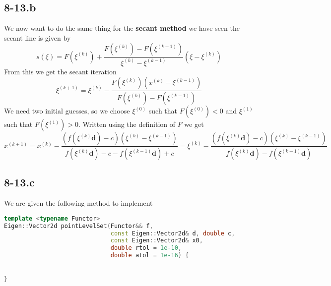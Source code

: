 \documentclass{article}
\begin{document}
\subsection*{8-13.b} We now want to do the same thing for the \textbf{secant method} we have seen the secant line is given by 
\begin{equation*}
    s\left(\xi\right) = F\left(\xi^{\left(k\right)}\right) + \frac{F\left(\xi^{\left(k\right)}\right) - F\left(\xi^{\left(k-1\right)}\right)}{\xi^{\left(k\right)}-\xi^{\left(k-1\right)}}\left(\xi - \xi^{\left(k\right)}\right)
\end{equation*}
From this we get the secant iteration
\begin{equation*}
    \xi^{\left(k+1\right)} = 
 \xi^{\left(k\right)} -\frac{F\left(\xi^{\left(k\right)}\right)\left(x^{\left(k\right)} - \xi^{\left(k-1\right)}\right)}{F\left(\xi^{\left(k\right)}\right)-F\left(\xi^{\left(k-1\right)}\right)}
\end{equation*}
We need two initial guesses, so we choose $\xi^{\left(0\right)}$ such that $F\left(\xi^{\left(0\right)}\right) <0$ and $\xi^{\left(1\right)}$ such that $F\left(\xi^{\left(1\right)}\right) >0$. Written using the definition of $F$ we get
\begin{equation*}
   x^{\left(k+1\right)} = x^{\left(k\right)} -\frac{\left(f\left(\xi^{\left(k\right)}\mathbf{d}\right)-c\right)\left(\xi^{\left(k\right)} - \xi^{\left(k-1\right)}\right)}{f\left(\xi^{\left(k\right)}\mathbf{d}\right) - c -f\left(\xi^{\left(k-1\right)}\mathbf{d}\right)+c} = \xi^{\left(k\right)} -\frac{\left(f\left(\xi^{\left(k\right)}\mathbf{d}\right)-c\right)\left(\xi^{\left(k\right)} - \xi^{\left(k-1\right)}\right)}{f\left(\xi^{\left(k\right)}\mathbf{d}\right)  -f\left(\xi^{\left(k-1\right)}\mathbf{d}\right)}
\end{equation*}

\subsection*{8-13.c}
We are given the following method to implement
\begin{lstlisting}[language=C++,
                   directivestyle={\color{black}}
                   emph={int,char,double,float,unsigned},
                   emphstyle={\color{blue}}
                  ]
template <typename Functor>
Eigen::Vector2d pointLevelSet(Functor&& f, 
                              const Eigen::Vector2d& d, double c,
                              const Eigen::Vector2d& x0, 
                              double rtol = 1e-10,
                              double atol = 1e-16) {


}
\end{lstlisting}
\end{document}
